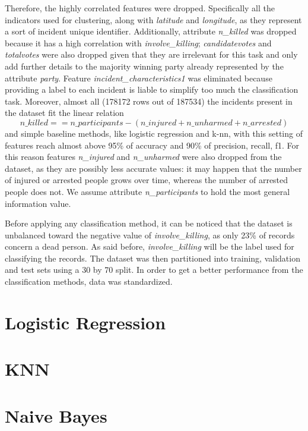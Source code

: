 \documentclass[10pt,a4paper]{report}
\begin{document}
Therefore, the highly correlated features were dropped.
Specifically all the indicators used for clustering, along with \textit{latitude} and \textit{longitude}, as they represent a sort of incident unique identifier.
Additionally, attribute \textit{n\_killed} was dropped because it has a high correlation with \textit{involve\_killing}; \textit{candidatevotes} and \textit{totalvotes} were also dropped given that they are irrelevant for this task and only add further details to the majority winning party already represented by the attribute \textit{party}.
Feature \textit{incident\_characteristics1} was eliminated because providing a label to each incident is liable to simplify too much the classification task.
Moreover, almost all (178172 rows out of 187534) the incidents present in the dataset fit the linear relation
$$ n\_killed == n\_participants - (n\_injured + n\_unharmed + n\_arrested) $$
and simple baseline methods, like logistic regression and k-nn, with this setting of features reach almost above 95\% of accuracy and 90\% of precision, recall, f1.
For this reason features \textit{n\_injured} and \textit{n\_unharmed} were also dropped from the dataset, as they are possibly less accurate values: it may happen that the number of injured or arrested people grows over time, whereas the number of arrested people does not.
We assume attribute \textit{n\_participants} to hold the most general information value.

Before applying any classification method, it can be noticed that the dataset is unbalanced toward the negative value of \textit{involve\_killing}, as only 23\% of records concern a dead person.
As said before, \textit{involve\_killing} will be the label used for classifying the records.
The dataset was then partitioned into training, validation and test sets using a 30 by 70 split.
In order to get a better performance from the classification methods, data was standardized.

\section{Logistic Regression}
\section{KNN}
\section{Naive Bayes}
\end{document}
